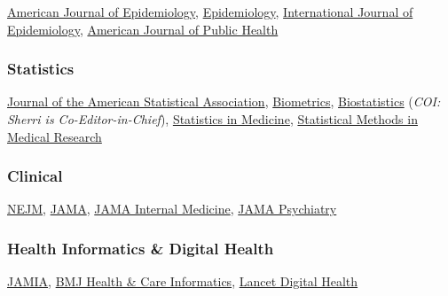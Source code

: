 \documentclass[
]{book}
\begin{document}
\href{https://academic.oup.com/aje}{American Journal of Epidemiology}, \href{https://journals.lww.com/epidem/pages/default.aspx}{Epidemiology}, \href{https://academic.oup.com/ije}{International Journal of Epidemiology}, \href{https://ajph.aphapublications.org/}{American Journal of Public Health}

\hypertarget{statistics-1}{%
\subsubsection*{Statistics}\label{statistics-1}}

\href{https://www.tandfonline.com/toc/uasa20/current}{Journal of the American Statistical Association}, \href{https://onlinelibrary.wiley.com/journal/15410420}{Biometrics}, \href{https://academic.oup.com/biostatistics}{Biostatistics} (\emph{COI: Sherri is Co-Editor-in-Chief}), \href{https://onlinelibrary.wiley.com/journal/10970258}{Statistics in Medicine}, \href{https://journals.sagepub.com/home/smm}{Statistical Methods in Medical Research}

\hypertarget{clinical}{%
\subsubsection*{Clinical}\label{clinical}}

\href{https://www.nejm.org/}{NEJM}, \href{https://jamanetwork.com/}{JAMA}, \href{https://jamanetwork.com/journals/jamainternalmedicine}{JAMA Internal Medicine}, \href{https://jamanetwork.com/journals/jamapsychiatry}{JAMA Psychiatry}

\hypertarget{health-informatics-digital-health}{%
\subsubsection*{Health Informatics \& Digital Health}\label{health-informatics-digital-health}}

\href{https://academic.oup.com/jamia}{JAMIA}, \href{https://informatics.bmj.com/}{BMJ Health \& Care Informatics}, \href{https://www.thelancet.com/journals/landig/home}{Lancet Digital Health}

  
\end{document}
